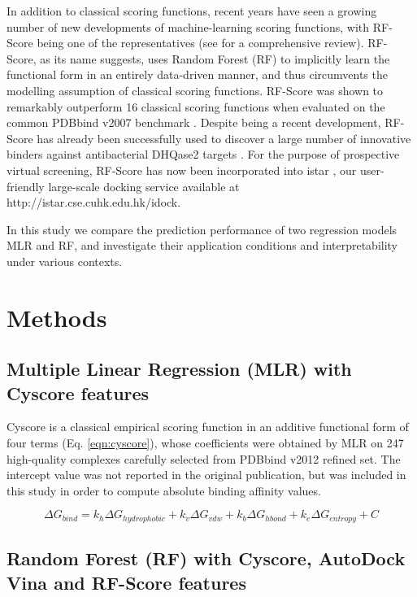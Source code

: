 \documentclass[journal=jacsat,manuscript=article]{achemso}
\begin{document}
In addition to classical scoring functions, recent years have seen a growing number of new developments of machine-learning scoring functions, with RF-Score \cite{564} being one of the representatives (see \cite{1373} for a comprehensive review). RF-Score, as its name suggests, uses Random Forest (RF) \cite{1309} to implicitly learn the functional form in an entirely data-driven manner, and thus circumvents the modelling assumption of classical scoring functions. RF-Score was shown to remarkably outperform 16 classical scoring functions when evaluated on the common PDBbind v2007 benchmark \cite{564}. Despite being a recent development, RF-Score has already been successfully used to discover a large number of innovative binders against antibacterial DHQase2 targets \cite{1281}. For the purpose of prospective virtual screening, RF-Score has now been incorporated into istar \cite{1362}, our user-friendly large-scale docking service available at http://istar.cse.cuhk.edu.hk/idock.

In this study we compare the prediction performance of two regression models MLR and RF, and investigate their application conditions and interpretability under various contexts.

\section{Methods}

\subsection{Multiple Linear Regression (MLR) with Cyscore features}

Cyscore is a classical empirical scoring function in an additive functional form of four terms (Eq. \ref{eqn:cyscore}), whose coefficients were obtained by MLR on 247 high-quality complexes carefully selected from PDBbind v2012 refined set. The intercept value was not reported in the original publication, but was included in this study in order to compute absolute binding affinity values.

\begin{equation}
\Delta G_{bind} = k_h\Delta G_{hydrophobic} + k_v\Delta G_{vdw} + k_b\Delta G_{hbond} + k_e\Delta G_{entropy} + C
\label{eqn:cyscore}
\end{equation}

\subsection{Random Forest (RF) with Cyscore, AutoDock Vina and RF-Score features}
\end{document}
